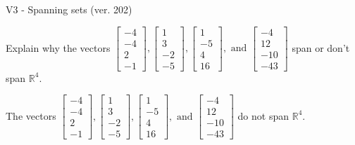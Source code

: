 \begin{exercise}
  \begin{exerciseTitle}V3 - Spanning sets (ver. 202)\end{exerciseTitle}
  \begin{exerciseStatement}
    Explain why the vectors \(\left[\begin{array}{r}
-4 \\
-4 \\
2 \\
-1
\end{array}\right] , \left[\begin{array}{r}
1 \\
3 \\
-2 \\
-5
\end{array}\right] , \left[\begin{array}{r}
1 \\
-5 \\
4 \\
16
\end{array}\right] , \text{ and } \left[\begin{array}{r}
-4 \\
12 \\
-10 \\
-43
\end{array}\right]\) span or don't span \(\mathbb{R}^4\). 
	


  \end{exerciseStatement}
  \begin{exerciseAnswer}
   The vectors \(\left[\begin{array}{r}
-4 \\
-4 \\
2 \\
-1
\end{array}\right] , \left[\begin{array}{r}
1 \\
3 \\
-2 \\
-5
\end{array}\right] , \left[\begin{array}{r}
1 \\
-5 \\
4 \\
16
\end{array}\right] , \text{ and } \left[\begin{array}{r}
-4 \\
12 \\
-10 \\
-43
\end{array}\right]\) 
  	 do not  
	span \(\mathbb{R}^4\).
  


  \end{exerciseAnswer}
\end{exercise}